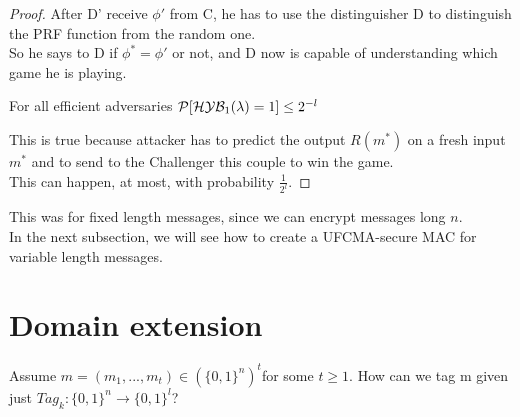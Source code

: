 \begin{proof}
After D' receive $\phi'$ from C, he has to use the distinguisher D to distinguish the PRF
function from the random one.\\
So he says to D if $\phi^{*}=\phi'$ or not, and D now is capable of
understanding which game he is playing.

\begin{lemma}
    For all efficient adversaries $ \mathcal{P} [ \mathcal{H}\mathcal{Y}\mathcal{B}_{1}(\lambda)=1 ] \leq 2^{-l}  $
\end{lemma}
This is true because attacker has to predict the output $R(m^{*})$ on a fresh
input $m^{*}$ and to send to the Challenger this couple to win the game.\\
This can happen, at most, with probability $\frac{1}{2^{l}}$.
\end{proof}

This was for fixed length messages, since we can encrypt messages long $n$.\\
In the next subsection, we will see how to create a UFCMA-secure MAC for
variable length messages.

\section{Domain extension}
Assume $m=(m_{1}, ..., m_{t}) \in (\{0,1\}^{n})^{t}$for some $t \geq 1$.
How can we tag m given just $Tag_{k}:\{0,1\}^{n} \to \{0,1\}^{l} $?\\


